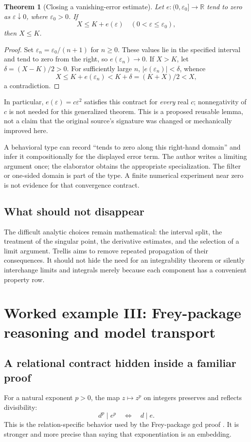 \documentclass[11pt,a4paper]{article}
\newtheorem{theorem}{Theorem}[section]
\theoremstyle{definition}
\theoremstyle{remark}
\newcommand{\R}{\mathbb R}
\begin{document}
\begin{theorem}[Closing a vanishing-error estimate]
\label{thm:error}
Let $e:(0,\varepsilon_0]\to\R$ tend to zero as $\varepsilon\downarrow0$, where $\varepsilon_0>0$. If
\[
 X\le K+e(\varepsilon)
 \quad(0<\varepsilon\le\varepsilon_0),
\]
then $X\le K$.
\end{theorem}
\begin{proof}
Set $\varepsilon_n=\varepsilon_0/(n+1)$ for $n\ge0$. These values lie in the specified interval and tend to zero from the right, so $e(\varepsilon_n)\to0$. If $X>K$, let $\delta=(X-K)/2>0$. For sufficiently large $n$, $|e(\varepsilon_n)|<\delta$, whence
\[
 X\le K+e(\varepsilon_n)<K+\delta=(K+X)/2<X,
\]
a contradiction.
\end{proof}

In particular, $e(\varepsilon)=c\varepsilon^2$ satisfies this contract for \emph{every} real $c$; nonnegativity of $c$ is not needed for this generalized theorem. This is a proposed reusable lemma, not a claim that the original source's signature was changed or mechanically improved here.

A behavioral type can record ``tends to zero along this right-hand domain'' and infer it compositionally for the displayed error term. The author writes a limiting argument once; the elaborator obtains the appropriate specialization. The filter or one-sided domain is part of the type. A finite numerical experiment near zero is not evidence for that convergence contract.

\subsection{What should not disappear}
The difficult analytic choices remain mathematical: the interval split, the treatment of the singular point, the derivative estimates, and the selection of a limit argument. Trellis aims to remove repeated propagation of their consequences. It should not hide the need for an integrability theorem or silently interchange limits and integrals merely because each component has a convenient property row.

\section{Worked example III: Frey-package reasoning and model transport}
\label{sec:frey}

\subsection{A relational contract hidden inside a familiar proof}
For a natural exponent $p>0$, the map $z\mapsto z^p$ on integers preserves and reflects divisibility:
\begin{equation}
 d^p\mid e^p\quad\Longleftrightarrow\quad d\mid e.
\label{eq:powreflect}
\end{equation}
This is the relation-specific behavior used by the Frey-package gcd proof \cite{freyDef}. It is stronger and more precise than saying that exponentiation is an embedding.
\end{document}

